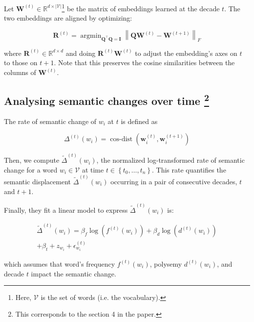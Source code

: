 \documentclass[11pt, twocolumn]{extarticle}
\DeclareMathOperator*{\argmin}{argmin}
\newcommand{\word}[1]{w_{#1}}
\begin{document}
Let $\mathbf{W}^{(t)} \in \mathbb{R}^{d \times|\mathcal{V}|}$\footnote{Here, $\mathcal{V}$ is the set of words (i.e. the vocabulary).} be the matrix of embeddings learned at the decade $t$. The two embeddings are aligned by optimizing:

\begin{equation}
    \mathbf{R}^{(t)}=\argmin _{\mathbf{Q}^{\top} \mathbf{Q}=\mathbf{I}}\left\|\mathbf{Q} \mathbf{W}^{(t)}-\mathbf{W}^{(t+1)}\right\|_{F}
\end{equation}
 
 where $\mathbf{R}^{(t)} \in \mathbb{R}^{d \times d}$ and doing $\mathbf{R}^{(t)} \mathbf{W}^{(t)}$ to adjust the embedding's axes on $t$ to those on $t + 1$. Note that this preserves the cosine similarities between the columns of $\mathbf{W}^{(t)}$.
 
\subsection*{Analysing semantic changes over time \footnote{This corresponds to the section 4 in the paper.}}

The rate of semantic change of $\word{i}$ at $t$ is defined as

\begin{equation}
    \Delta^{(t)}\left(w_{i}\right)=\operatorname{cos-dist}\left(\mathbf{w}_{i}^{(t)}, \mathbf{w}_{i}^{(t+1)}\right)
\end{equation}

Then, we compute \(\tilde{\Delta}^{( t )}(w_{i})\), the normalized log-transformed rate of semantic change  for a word \(w_{i} \in \mathcal{V}\) at time \(t \in \left\{ t_{0},\dots,t_{n} \right\}\). This rate quantifies the semantic displacement \(\tilde{\Delta}^{( t )}(w_i)\) occurring in a pair of consecutive decades, $t$ and $t+1$. 
\par

Finally, they fit a linear model to express \(\tilde{\Delta}^{( t )} ( w_i )\) is:

\begin{gather*}
\tilde{\Delta}^{( t )} ( w_i ) = \beta_f \log \left( f^{( t )} ( w_i ) \right) +\beta_d \log \left( d^{( t ) } ( w_i ) \right) \\
+ \beta_{t} + z_{w_i} + \epsilon_{w_i}^{( t ) }
\end{gather*} 

which assumes that word's frequency \(f^{( t )} ( w_i )\), polysemy \(d^{( t ) } ( w_i )\), and decade \(t\) impact the semantic change. 
\end{document}
